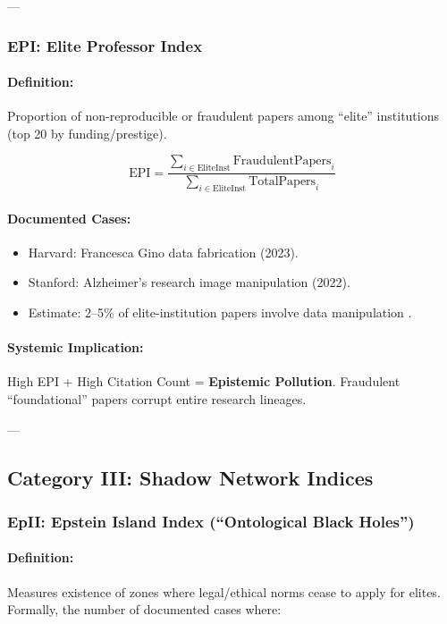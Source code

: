 \documentclass[11pt,a4paper]{article}
\theoremstyle{definition}
\theoremstyle{remark}
\begin{document}
---

\subsubsection{EPI: Elite Professor Index}

\paragraph{Definition:}
Proportion of non-reproducible or fraudulent papers among ``elite'' institutions (top 20 by funding/prestige).

\[
\text{EPI} = \frac{\sum_{i \in \text{EliteInst}} \text{FraudulentPapers}_i}{\sum_{i \in \text{EliteInst}} \text{TotalPapers}_i}
\]

\paragraph{Documented Cases:}
\begin{itemize}
\item Harvard: Francesca Gino data fabrication (2023).
\item Stanford: Alzheimer's research image manipulation (2022).
\item Estimate: 2–5\% of elite-institution papers involve data manipulation \cite{nat_misconduct}.
\end{itemize}

\paragraph{Systemic Implication:}
High EPI + High Citation Count = \textbf{Epistemic Pollution}. Fraudulent ``foundational'' papers corrupt entire research lineages.

---

\subsection{Category III: Shadow Network Indices}

\subsubsection{EpII: Epstein Island Index (``Ontological Black Holes'')}

\paragraph{Definition:}
Measures existence of zones where legal/ethical norms cease to apply for elites. Formally, the number of documented cases where:
\end{document}
